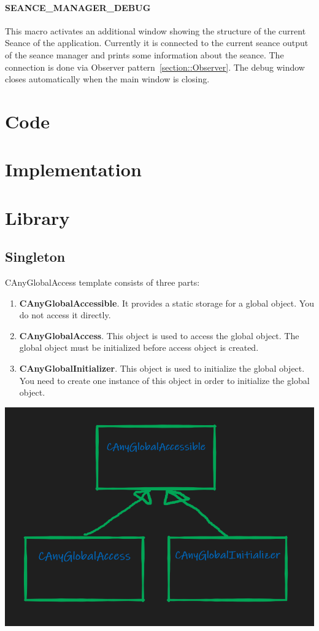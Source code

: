 \documentclass{article}
\begin{document}
\paragraph{SEANCE\_MANAGER\_DEBUG}

This macro activates an additional window showing the structure of the current Seance of the application. Currently it is connected to the current seance output of the seance manager and prints some information about the seance. The connection is done via Observer pattern~\ref{section::Observer}. The debug window closes automatically when the main window is closing.

\section{Code}

\section{Implementation}

\section{Library}
\subsection{Singleton}\label{section::Singleton}
CAnyGlobalAccess template consists of three parts:
\begin{enumerate}
\item \textbf{CAnyGlobalAccessible}. It provides a static storage for a global object. You do not access it directly.
\item \textbf{CAnyGlobalAccess}. This object is used to access the global object. The global object must be initialized before access object is created.
\item \textbf{CAnyGlobalInitializer}. This object is used to initialize the global object. You need to create one instance of this object in order to initialize the global object.
\end{enumerate}
\begin{center}
\includegraphics[scale = 0.3]{Figures/CAnyGlobalAccess.png}
\end{center}
\end{document}
